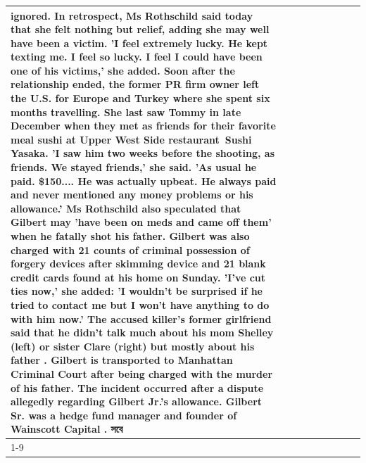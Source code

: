 \begin{table}[H]
\begin{tabular}{lllrlllll}
ignored. In retrospect, Ms Rothschild said today that she felt nothing but relief, adding she may well have been a victim. 'I feel extremely lucky. He kept texting me. I feel so lucky. I feel I could have been one of his victims,' she added. Soon after the relationship ended, the former PR firm owner left the U.S. for Europe and Turkey where she spent six months  travelling. She last saw Tommy in late December when they met as friends for their favorite meal sushi at Upper West Side restaurant Sushi Yasaka. 'I saw him two weeks before the shooting, as friends. We stayed friends,' she said. 'As usual he paid. \$150.... He was actually upbeat. He always paid and never mentioned any money problems or his allowance.' Ms Rothschild also speculated that Gilbert may 'have been on meds and came off them' when he fatally shot his father. Gilbert was also charged with 21 counts of criminal possession of forgery devices after skimming device and 21 blank credit cards found at his home on Sunday. 'I've cut ties now,' she added: 'I wouldn’t be surprised if he tried to contact me but I won’t have anything to do with him now.' The accused killer's former girlfriend said that he didn't talk much about his mom Shelley (left) or sister Clare (right) but mostly about his father . Gilbert is transported to Manhattan Criminal Court  after being charged with the murder of his father. The incident occurred after a dispute allegedly regarding Gilbert Jr.'s allowance. Gilbert Sr. was a hedge fund manager and founder of Wainscott Capital . সবে \\
\cline{1-9}

\end{tabular}
\end{table}
